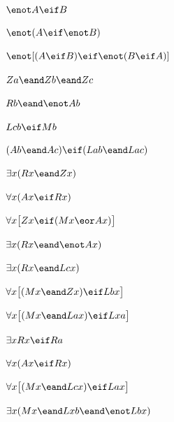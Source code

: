 \begin{earg}
\item %
$\enot A \eif B$
\item %
$\enot(A \eif \enot B)$
\item %
$\enot [(A\eif B) \eif \enot(B\eif A)]$
\end{earg}



\begin{earg}
\item %
$Za \eand Zb \eand Zc$
\item %
$Rb \eand \enot Ab$
\item %
$Lcb \eif Mb$
\item %
$(Ab \eand Ac)\eif(Lab \eand Lac)$
\item %
$\exists x(Rx \eand Zx)$
\item %
$\forall x(Ax \eif Rx)$
\item %
$\forall x\bigl[Zx \eif (Mx \eor Ax)\bigr]$
\item %
$\exists x(Rx \eand \enot Ax)$
\item %
$\exists x(Rx \eand Lcx)$
\item %
$\forall x\bigl[(Mx \eand Zx) \eif Lbx\bigr]$
\item %
$\forall x\bigl[(Mx \eand Lax) \eif Lxa\bigr]$
\item %
$\exists x Rx \eif Ra$
\item %
$\forall x(Ax \eif Rx)$
\item %
$\forall x\bigl[(Mx \eand Lcx) \eif Lax\bigr]$
\item %
$\exists x(Mx \eand Lxb \eand \enot Lbx)$
\end{earg}


